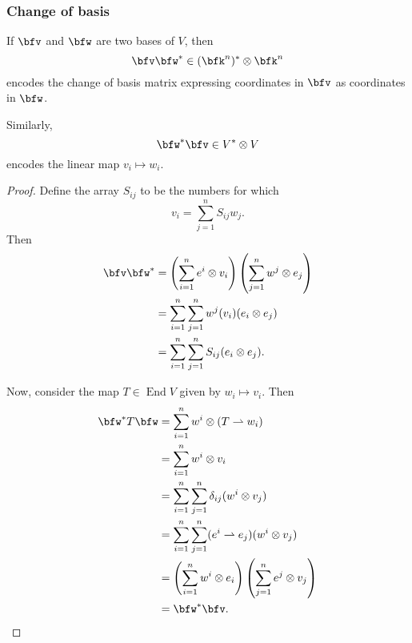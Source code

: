 \documentclass{article}
\DeclareMathOperator{\End}{End}
\begin{document}
\subsubsection{Change of basis}

\begin{proposition}
    If $\bfv$ and $\bfw$ are two bases of $V$, then
    \[
        \bfv\bfw^\ast \in (\bfk^n)^\ast \otimes \bfk^n
    \]
    encodes the change of basis matrix expressing coordinates in $\bfv$ as coordinates in $\bfw$.

    Similarly,
    \[
        \bfw^\ast\bfv \in V^\ast \otimes V
    \]
    encodes the linear map $v_i \mapsto w_i$.
\end{proposition}
\begin{proof}
    Define the array $S_{ij}$ to be the numbers for which
    \[
        v_i
        =
        \sum_{j=1}^n
        S_{ij}w_j.
    \]
    Then
    \begin{align*}
       \bfv \bfw^\ast
       &=
       \left(
           \sum_{i=1}^n
           e^i \otimes v_i
       \right)
       \left(
           \sum_{j=1}^n
           w^j \otimes e_j
       \right)
       \\
       &=
       \sum_{i=1}^n
       \sum_{j=1}^n
       w^j(v_i)
       (e_i \otimes e_j)
       \\
       &=
       \sum_{i=1}^n
       \sum_{j=1}^n
       S_{ij}
       (e_i \otimes e_j).
    \end{align*}

    Now, consider the map $T \in \End V$ given by $w_i \mapsto v_i$.
    Then
    \begin{align*}
        \bfw^\ast T \bfw
        &=
        \sum_{i=1}^n
        w^i \otimes (T \rightharpoonup w_i)
        \\
        &=
        \sum_{i=1}^n
        w^i \otimes v_i
        \\
        &=
        \sum_{i=1}^n
        \sum_{j=1}^n
        \delta_{ij}
        (w^i \otimes v_j)
        \\
        &=
        \sum_{i=1}^n
        \sum_{j=1}^n
        (e^i \rightharpoonup e_j)
        (w^i \otimes v_j)
        \\
        &=
        \left(
            \sum_{i=1}^n
            w^i \otimes e_i
        \right)
        \left(
            \sum_{j=1}^n
            e^j \otimes v_j
        \right)
        \\
        &=
        \bfw^\ast\bfv.
    \end{align*}
\end{proof}
\end{document}
